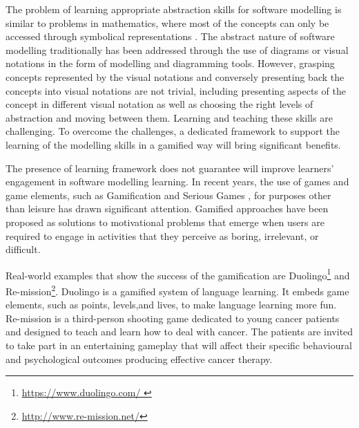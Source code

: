 \documentclass[12pt, a4paper]{report} \usepackage[titletoc]{appendix}
\begin{document}
The problem of learning appropriate abstraction skills for software modelling is similar to problems in mathematics, where most of the concepts can only be accessed through symbolical representations \cite{Duval2006}. The abstract nature of software modelling traditionally has been addressed through the use of diagrams or visual notations in the form of modelling and diagramming tools. However, grasping concepts represented by the visual notations and conversely presenting back the concepts into visual notations are not trivial, including presenting aspects of the concept in different visual notation as well as choosing the right levels of abstraction and moving between them. Learning and teaching these skills are challenging. To overcome the challenges, a dedicated framework to support the learning of the modelling skills in a gamified way will bring significant benefits. 
 
The presence of learning framework does not guarantee will improve learners' engagement in software modelling learning. In recent years, the use of games and game elements, such as Gamification \cite{deterding2011game} and Serious Games \cite{Michael2005}, for purposes other than leisure has drawn significant attention. Gamified approaches have been proposed as solutions to motivational problems that emerge when users are required to engage in activities that they perceive as boring, irrelevant, or difficult. 

Real-world examples that show the success of the gamification are Duolingo\footnote{\url{https://www.duolingo.com/ }} and Re-mission\footnote{\url{http://www.re-mission.net/}}. Duolingo is a gamified system of language learning. It embeds game elements, such as points, levels,and lives, to make language learning more fun. Re-mission is a third-person shooting game dedicated to young cancer patients and designed to teach and learn how to deal with cancer. The patients are invited to take part in an entertaining gameplay that will affect their specific behavioural and psychological outcomes producing effective cancer therapy.
 
\end{document}
